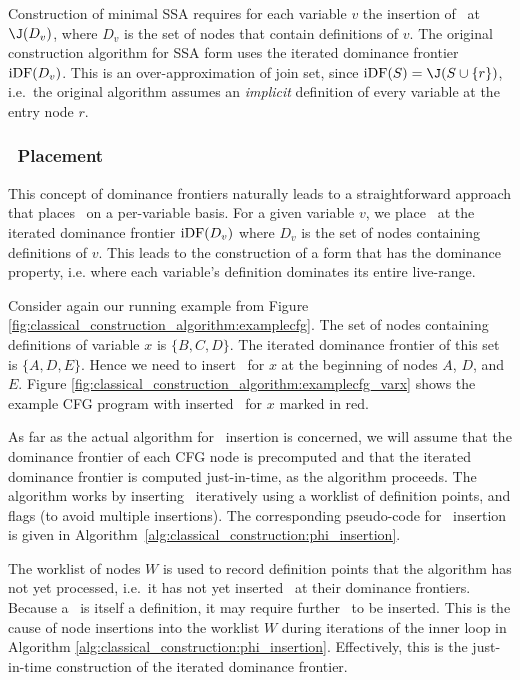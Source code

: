 Construction of minimal SSA 
requires for each variable $v$ the insertion of \phiops\ at $\join(D_v)$,
where $D_v$ is the set of nodes that contain definitions of $v$.
The original construction algorithm
for SSA form uses the iterated dominance frontier $\mathrm{iDF}(D_v)$.
This is an over-approximation of join set, since
$\iDF(S)=\join(S\cup \{r\})$,
i.e.\ the original algorithm assumes an \emph{implicit} definition of every
variable at the entry node $r$.


\subsubsection*{\phiop\ Placement}

This concept of dominance frontiers 
naturally leads to a
straightforward approach that places \phiops\
on a per-variable basis.
For a given variable $v$, we place \phiops\ at the
iterated dominance frontier $\mathrm{iDF}(D_v)$ where
$D_v$ is the set of nodes containing definitions of $v$.
This leads to the construction of a form that has 
the dominance property, i.e. where each variable's definition dominates its entire live-range.

Consider again our running example from Figure 
\ref{fig:classical_construction_algorithm:examplecfg}. The set of nodes containing definitions
of variable
$x$ is $\{ B,C,D \}$. The iterated dominance frontier of this set
is $\{ A, D, E \}$. Hence we need to insert 
\phiops\ for $x$ at the beginning of nodes $A$, $D$, and $E$.
Figure \ref{fig:classical_construction_algorithm:examplecfg_varx} shows the example CFG program
with inserted \phiops\ for $x$ marked in red.



As far as the actual algorithm for \phiops\ insertion
is concerned, we will assume that the dominance
frontier of each CFG node is precomputed and that the iterated dominance frontier is computed just-in-time, as the algorithm proceeds.
The algorithm works by inserting \phiops\ iteratively
using a worklist of definition points, and flags (to avoid multiple
insertions). The corresponding pseudo-code for
\phiop\ insertion is given in
Algorithm~\ref{alg:classical_construction:phi_insertion}.


The worklist of nodes $W$ is used to record definition points that the
algorithm
has not yet processed, i.e.\ it has not yet inserted \phiops\ at their dominance
frontiers.
Because a \phiop\ is itself a 
definition, it may require further \phiops\ to be inserted.
This is the cause of node insertions into the worklist $W$ during
iterations of the inner loop in Algorithm 
\ref{alg:classical_construction:phi_insertion}.
Effectively, this is the just-in-time construction of
the iterated dominance frontier.


